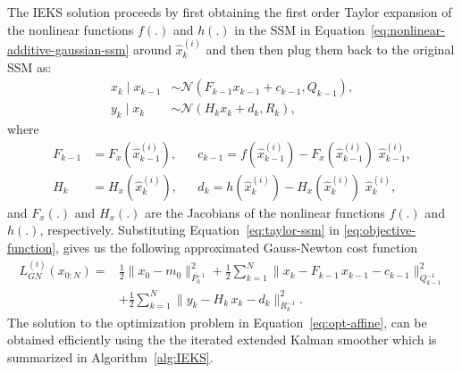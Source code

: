 \documentclass[dissertation,math,vertlayout,pdfa,colorlinks,nologo]{aaltoseries}
\begin{document}
The IEKS solution proceeds by first obtaining the first order Taylor expansion of the nonlinear functions $f(.)$ and $h(.)$ in the SSM in Equation~\eqref{eq:nonlinear-additive-gaussian-ssm} around $\hat{x}^{(i)}_{k}$ and then then plug them back to the original SSM as:
\begin{equation} \label{eq:taylor-ssm}
    \begin{split}
        x_k \mid x_{k-1} &\sim \mathcal{N}(F_{k-1} x_{k-1} + c_{k-1}, Q_{k-1}),\\
        y_k \mid x_k &\sim \mathcal{N}(H_k x_k + d_k, R_k),
    \end{split}
\end{equation}
where 
\begin{align}
        F_{k-1} &= F_x(\hat{x}^{(i)}_{k - 1}), &&c_{k-1} = f(\hat{x}^{(i)}_{k - 1}) - F_x(\hat{x}^{(i)}_{k - 1}) \, \,  \hat{x}^{(i)}_{k - 1}, \\
        H_k &= H_x(\hat{x}^{(i)}_{k}),  && d_k = h(\hat{x}^{(i)}_{k }) - H_x(\hat{x}^{(i)}_{k}) \, \, \hat{x}^{(i)}_{k},
\end{align}
and $F_x(.)$ and $H_x(.)$ are the Jacobians of the nonlinear functions $f(.)$ and $h(.)$, respectively. Substituting Equation~\eqref{eq:taylor-ssm} in \eqref{eq:objective-function}, gives us the following approximated Gauss-Newton cost function 
\begin{equation} \label{eq:opt-affine}
    \begin{split}
        L^{(i)}_{GN}(x_{0:N}) =& \frac{1}{2} \lVert x_{0}
        - m_{0} \rVert^{2}_{P_{0}^{-1}} + \frac{1}{2} \sum_{k=1}^{N} \lVert x_{k}- F_{k-1} \, x_{k-1} - c_{k-1} \rVert^{2}_{Q_{k-1}^{-1}}  \\
        &+ \frac{1}{2} \sum_{k=1}^{N} \lVert y_{k}- H_{k} \, x_{k} - d_{k} \rVert^{2}_{R_{k}^{-1}}.
    \end{split}
\end{equation}
The solution to the optimization problem in Equation~\eqref{eq:opt-affine}, can be obtained efficiently using the the iterated extended Kalman smoother which is summarized in Algorithm~\ref{alg:IEKS}.
\end{document}
